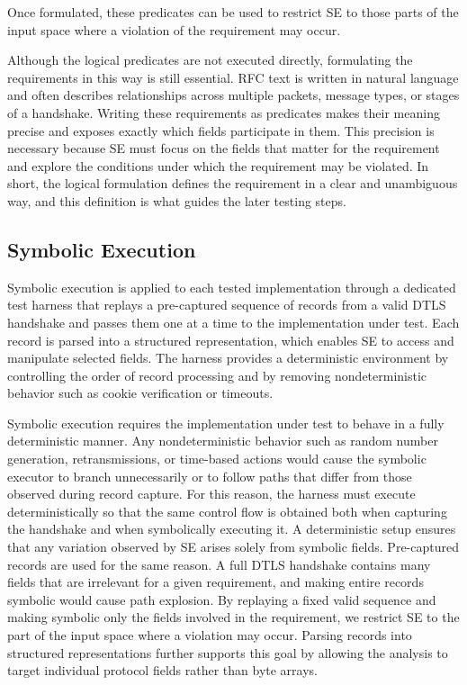 Once formulated, these predicates can be used to restrict SE to those parts of the input space where a violation of the requirement may occur.

Although the logical predicates are not executed directly, formulating the requirements in this way is still essential.
RFC text is written in natural language and often describes relationships across multiple packets, message types, or stages of a handshake.
Writing these requirements as predicates makes their meaning precise and exposes exactly which fields participate in them.
This precision is necessary because SE must focus on the fields that matter for the requirement and explore the conditions under which the requirement may be violated.
In short, the logical formulation defines the requirement in a clear and unambiguous way, and this definition is what guides the later testing steps.

\subsection{Symbolic Execution}
Symbolic execution is applied to each tested implementation through a dedicated test harness that replays a pre-captured sequence of records from a valid DTLS handshake and passes them one at a time to the implementation under test.
Each record is parsed into a structured representation, which enables SE to access and manipulate selected fields. 
The harness provides a deterministic environment by controlling the order of record processing and by removing nondeterministic behavior such as cookie verification or timeouts.

Symbolic execution requires the implementation under test to behave in a fully deterministic manner.
Any nondeterministic behavior such as random number generation, retransmissions, or time-based actions would cause the symbolic executor to branch unnecessarily or to follow paths that differ from those observed during record capture.
For this reason, the harness must execute deterministically so that the same control flow is obtained both when capturing the handshake and when symbolically executing it.
A deterministic setup ensures that any variation observed by SE arises solely from symbolic fields.
Pre-captured records are used for the same reason.
A full DTLS handshake contains many fields that are irrelevant for a given requirement, and making entire records symbolic would cause path explosion.
By replaying a fixed valid sequence and making symbolic only the fields involved in the requirement, we restrict SE to the part of the input space where a violation may occur.
Parsing records into structured representations further supports this goal by allowing the analysis to target individual protocol fields rather than byte arrays.

